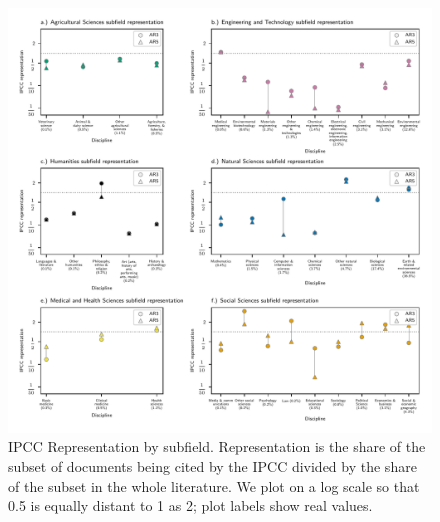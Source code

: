 \documentclass{article}
\begin{document}
	\begin{figure}
		\begin{center}
			\includegraphics[width=1\linewidth]{../plots_pub/ipcc_rep_wcs_simplified.pdf}
			\caption{IPCC Representation by subfield. Representation is the share of the subset of documents being cited by the IPCC divided by the share of the subset in the whole literature. We plot on a log scale so that 0.5 is equally distant to 1 as 2; plot labels show real values.}
			\label{subfield}
		\end{center}
	\end{figure}
	
\end{document}
